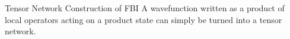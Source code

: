 \begin{frame}{Tensor Network Construction of FBI}
\vskip-1.5cm
A wavefunction written as a product of local operators acting on a product state can simply be turned into a tensor network.


\end{frame}